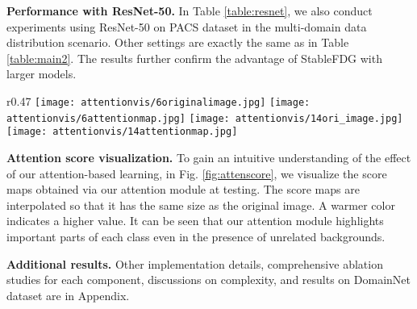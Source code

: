 \documentclass{article}
\theoremstyle{plain}
\theoremstyle{definition}
\theoremstyle{remark}
\begin{document}
\textbf{Performance with ResNet-50.} In Table \ref{table:resnet}, we also conduct experiments using ResNet-50 on PACS  dataset in the  multi-domain data distribution scenario. Other settings are exactly the same as in Table \ref{table:main2}. The results further confirm the advantage of StableFDG with larger models.
 \vspace{-0.4mm}

\begin{wrapfigure}{r}{0.47\textwidth}
 \vspace{-3.5mm}
  \centering
  \texttt{[image: attentionvis/6originalimage.jpg]}
\texttt{[image: attentionvis/6attentionmap.jpg]}
  \texttt{[image: attentionvis/14ori\_image.jpg]}
\texttt{[image: attentionvis/14attentionmap.jpg]}
  \vspace{-1mm}
  \caption{Visualization of    attention score maps of each input image (left: bed, right: radio).}
  \label{fig:attenscore}
  \vspace{-4mm}
\end{wrapfigure}
 \textbf{Attention score visualization.} To gain an intuitive understanding of the effect of our attention-based learning, in Fig. \ref{fig:attenscore}, we visualize the   score maps obtained via our attention module at testing. The   score maps are interpolated so that it has the same size as the original image. A warmer color indicates a higher value. It can be seen  that our attention module highlights important parts of each class even in the presence of  unrelated backgrounds.

 
\textbf{Additional results.} Other implementation details, comprehensive ablation studies for each component,  discussions on complexity, and results on DomainNet dataset are in Appendix.  
\end{document}
